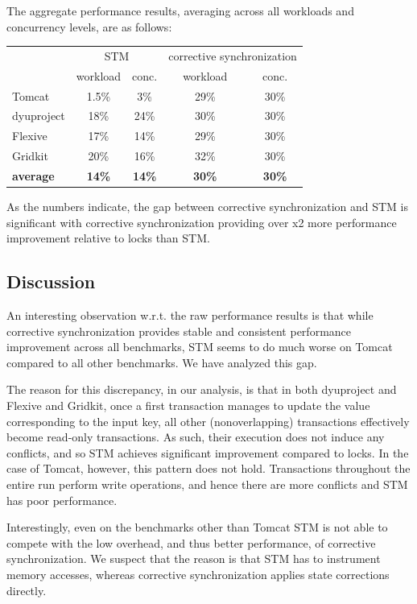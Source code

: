 The aggregate performance results, averaging across all workloads and concurrency levels, are as follows:
\begin{center}
\begin{tabular}{l|c|c|c|c}
					& \multicolumn{2}{c|}{STM} & \multicolumn{2}{c}{corrective synchronization} \\
					\cline{2-5} 
					& workload & conc. & workload & conc. \\
\hline
Tomcat	  	 &	1.5\%		&	3\% & 29\%		& 30\% \\			   
dyuproject	 & 	18\%		& 	24\%	    & 30\% &	30\%	\\
Flexive 		&	17\%	  &		14\%			& 29\% & 30\%	\\ 
Gridkit 		&	20\% 	&		16\%		& 32\% & 30\%	\\
\hline\hline	
{\bf average} & {\bf 14\%} 	&   {\bf 14\%}    & {\bf 30\%}   & {\bf 30\%} \\
\end{tabular}
\end{center}
As the numbers indicate, the gap between corrective synchronization and STM is significant with corrective synchronization providing over x2 more performance improvement relative to locks than STM.

\subsection{Discussion}

An interesting observation w.r.t. the raw performance results is that while corrective synchronization provides stable and consistent performance improvement across all benchmarks, STM seems to do much worse on Tomcat compared to all other benchmarks. We have analyzed this gap.

The reason for this discrepancy, in our analysis, is that in both dyuproject and Flexive and Gridkit, once a first transaction manages to update the value corresponding to the input key, all other (nonoverlapping) transactions effectively become read-only transactions. As such, their execution does not induce any conflicts, and so STM achieves significant improvement compared to locks. In the case of Tomcat, however, this pattern does not hold. Transactions throughout the entire run perform write operations, and hence there are more conflicts and STM has poor performance.

Interestingly, even on the benchmarks other than Tomcat STM is not able to compete with the low overhead, and thus better performance, of corrective synchronization. We suspect that the reason is that STM has to instrument memory accesses, whereas corrective synchronization applies state corrections directly.

